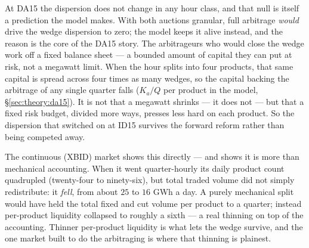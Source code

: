 \documentclass[11pt,a4paper]{article}
\theoremstyle{definition}
\theoremstyle{remark}
\theoremstyle{plain}
\begin{document}
At DA15 the dispersion does not change in any hour class, and that null is itself a prediction the model makes. With both auctions granular, full arbitrage \emph{would} drive the wedge dispersion to zero; the model keeps it alive instead, and the reason is the core of the DA15 story. The arbitrageurs who would close the wedge work off a fixed balance sheet --- a bounded amount of capital they can put at risk, not a megawatt limit. When the hour splits into four products, that same capital is spread across four times as many wedges, so the capital backing the arbitrage of any single quarter falls ($K_a/Q$ per product in the model, \S\ref{sec:theory:da15}). It is not that a megawatt shrinks --- it does not --- but that a fixed risk budget, divided more ways, presses less hard on each product. So the dispersion that switched on at ID15 survives the forward reform rather than being competed away.

The continuous (XBID) market shows this directly --- and shows it is more than mechanical accounting. When it went quarter-hourly its daily product count quadrupled (twenty-four to ninety-six), but total traded volume did not simply redistribute: it \emph{fell}, from about $25$ to $16$ GWh a day. A purely mechanical split would have held the total fixed and cut volume per product to a quarter; instead per-product liquidity collapsed to roughly a sixth --- a real thinning on top of the accounting. Thinner per-product liquidity is what lets the wedge survive, and the one market built to do the arbitraging is where that thinning is plainest.
\end{document}
